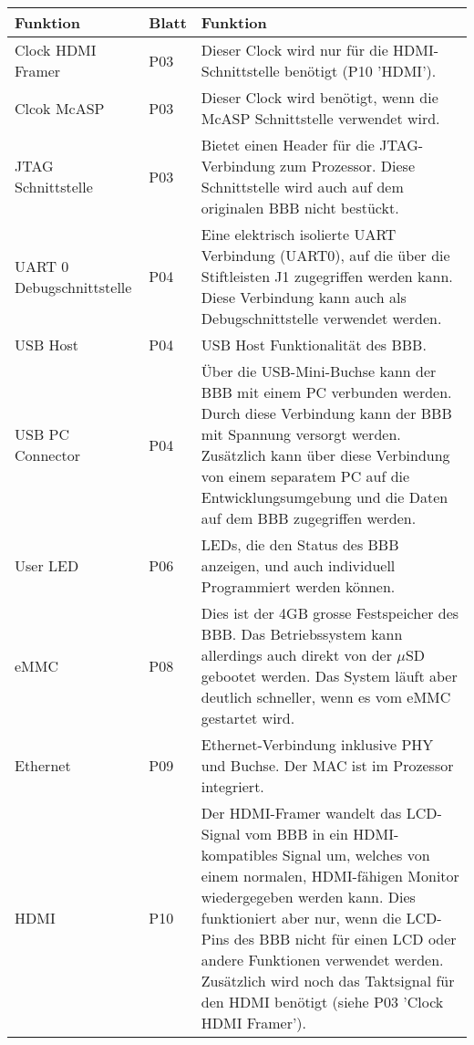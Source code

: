 \begin{table}
    \begin{tabular}{ | p{2.5cm} | l | p{9.5cm} |}
    \hline
    \textbf{Funktion}		& \textbf{Blatt} 	& \textbf{Funktion} \\ \hline
    
    Clock HDMI Framer		& P03		& Dieser Clock wird nur für die HDMI-Schnittstelle benötigt (P10 'HDMI').\\ \hline   
    
    Clcok McASP				& P03		& Dieser Clock wird benötigt, wenn die McASP Schnittstelle verwendet wird.\\ \hline   
    
    JTAG Schnittstelle		& P03		& Bietet einen Header für die JTAG-Verbindung zum Prozessor. Diese Schnittstelle wird auch auf dem originalen BBB nicht bestückt.\\ \hline  
    
    UART 0 Debugschnittstelle	& P04		& Eine elektrisch isolierte UART Verbindung (UART0), auf die über die Stiftleisten J1 zugegriffen werden kann. Diese Verbindung kann auch als Debugschnittstelle verwendet werden. \\ \hline      
    
    USB Host				& P04		& USB Host Funktionalität des BBB.\\ \hline    
    
    USB PC Connector		& P04		& Über die USB-Mini-Buchse kann der BBB mit einem PC verbunden werden. Durch diese Verbindung kann der BBB mit Spannung versorgt werden. Zusätzlich kann über diese Verbindung von einem separatem PC auf die Entwicklungsumgebung und die Daten auf dem BBB zugegriffen werden.\\ \hline    
    
    User LED				& P06		& LEDs, die den Status des BBB anzeigen, und auch individuell Programmiert werden können.\\ \hline  
    
    eMMC					& P08		& Dies ist der 4GB grosse Festspeicher des BBB. Das Betriebssystem kann allerdings auch direkt von der $\mu$SD gebootet werden. Das System läuft aber deutlich schneller, wenn es vom eMMC gestartet wird. \\ \hline 
    
    Ethernet				& P09		& Ethernet-Verbindung inklusive PHY und Buchse. Der MAC ist im Prozessor integriert.\\ \hline    
    
    HDMI					& P10		& Der HDMI-Framer wandelt das LCD-Signal vom BBB in ein HDMI-kompatibles Signal um, welches von einem normalen, HDMI-fähigen Monitor wiedergegeben werden kann. Dies funktioniert aber nur, wenn die LCD-Pins des BBB nicht für einen LCD oder andere Funktionen verwendet werden. Zusätzlich wird noch das Taktsignal für den HDMI benötigt (siehe P03 'Clock HDMI Framer'). \\ \hline   
    

\end{tabular}
\end{table}
